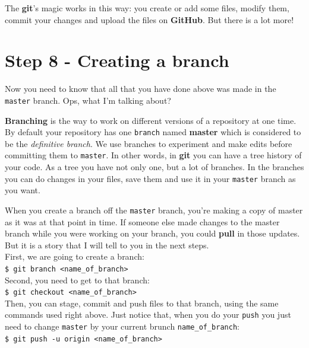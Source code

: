 \documentclass[12pt,a4paper,titlepage,brazil]{article}
\begin{document}
{The {\bf git}'s magic works in this way: you create or add some files, modify them, commit your changes and upload the files on {\bf GitHub}. But there is a lot more!


\section{Step 8 - Creating a branch}

Now you need to know that all that you have done above was made in the \texttt{master} branch. Ops, what I'm talking about?

{\bf Branching} is the way to work on different versions of a repository at one time. By default your repository has one \texttt{branch} named {\bf master} which is considered to be the {\em definitive branch}. We use branches to experiment and make edits before committing them to \texttt{master}. In other words, in {\bf git} you can have a tree history of your code. As a tree you have not only one, but a lot of branches. In the branches you can do changes in your files, save them and use it in your \texttt{master} branch as you want.

When you create a branch off the \texttt{master} branch, you’re making a copy of master as it was at that point in time. If someone else made changes to the master branch while you were working on your branch, you could {\bf pull} in those updates. But it is a story that I will tell to you in the next steps.\\

First, we are going to create a branch:\\

\texttt{\$ git branch <name\_of\_branch>}\\

Second, you need to get to that branch:\\

\texttt{\$ git checkout <name\_of\_branch>}\\

Then, you can stage, commit and push files to that branch, using the same commands used right above. Just notice that, when you do your \texttt{push} you just need to change \texttt{master} by your current brunch \texttt{name\_of\_branch}:\\

\texttt{\$ git push -u origin <name\_of\_branch>}\\

}
\end{document}
